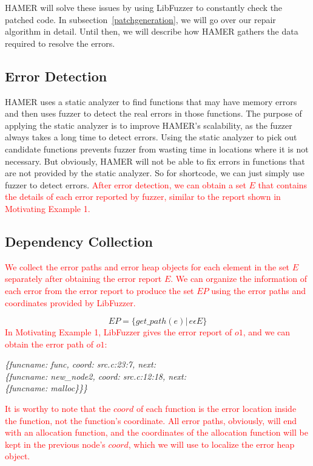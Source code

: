 \documentclass[a4j,dvipdfmx]{article}
\begin{document}
HAMER will solve these issues by using LibFuzzer to constantly check the patched code. In subsection~\ref{patchgeneration}, we will go over our repair algorithm in detail. Until then, we will describe how HAMER gathers the data required to resolve the errors.

\subsection{Error Detection}
HAMER uses a static analyzer to find functions that may have memory errors and then uses fuzzer to detect the real errors in those functions. The purpose of applying the static analyzer is to improve HAMER's scalability, as the fuzzer always takes a long time to detect errors. Using the static analyzer to pick out candidate functions prevents fuzzer from wasting time in locations where it is not necessary. But obviously, HAMER will not be able to fix errors in functions that are not provided by the static analyzer. So for shortcode, we can just simply use fuzzer to detect errors. \textcolor{red}{After error detection, we can obtain a set $E$ that contains the details of each error reported by fuzzer, similar to the report shown in Motivating Example 1.}


\subsection{Dependency Collection}

\textcolor{red}{
We collect the error paths and error heap objects for each element in the set $E$ separately after obtaining the error report $E$. We can organize the information of each error from the error report to produce the set $EP$ using the error paths and coordinates provided by LibFuzzer. 
}

\begin{equation}
EP=\{get\_path(e)|\, e \epsilon E\}
\end{equation}
\textcolor{red}{
In Motivating Example 1, LibFuzzer gives the error report of $o1$, and we can obtain the error path of $o1$:
}

\begin{minipage}{\textwidth}
\vspace{0.2cm}
\textsl{\hspace{0.3cm}\{funcname: func, coord: src.c:23:7, next:\\\hspace{0.6cm}\{funcname: new\_node2, coord: src.c:12:18, next:\\\hspace{0.9cm}\{funcname: malloc\}\}\}}
\vspace{0.2cm}
\end{minipage}
\textcolor{red}{
It is worthy to note that the $coord$ of each function is the error location inside the function, not the function's coordinate. All error paths, obviously, will end with an allocation function, and the coordinates of the allocation function will be kept in the previous node's $coord$, which we will use to localize the error heap object.
}
\end{document}
